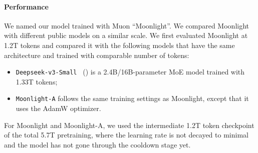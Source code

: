 \paragraph{Performance} We named our model trained with Muon ``Moonlight''. We compared Moonlight with different public models on a similar scale. We first evaluated Moonlight at 1.2T tokens and compared it with the following models that have the same architecture and trained with comparable number of tokens:

\begin{itemize}    
    \item \texttt{Deepseek-v3-Small } (\cite{deepseekai2024deepseekv3technicalreport}) is a  2.4B/16B-parameter MoE model trained with 1.33T tokens;
    \item \texttt{Moonlight-A} follows the same training settings as Moonlight, except that it uses the AdamW optimizer.
\end{itemize}

 For Moonlight and Moonlight-A, we used the intermediate 1.2T token checkpoint of the total 5.7T pretraining, where the learning rate is not decayed to minimal and the model has not gone through the cooldown stage yet.

